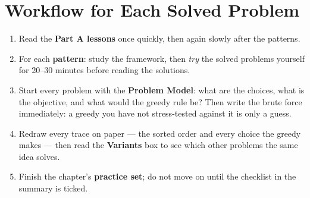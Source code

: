 \section*{Workflow for Each Solved Problem}

\begin{insightbox}
\begin{center}
\end{center}
\begin{enumerate}[leftmargin=*]
    \item Read the \textbf{Part A lessons} once quickly, then again slowly after the patterns.
    \item For each \textbf{pattern}: study the framework, then \emph{try} the solved problems yourself for 20--30 minutes before reading the solutions.
    \item Start every problem with the \textbf{Problem Model}: what are the choices, what is the objective, and what would the greedy rule be? Then write the brute force immediately: a greedy you have not stress-tested against it is only a guess.
    \item Redraw every trace on paper --- the sorted order and every choice the greedy makes --- then read the \textbf{Variants} box to see which other problems the same idea solves.
    \item Finish the chapter's \textbf{practice set}; do not move on until the checklist in the summary is ticked.
\end{enumerate}
\end{insightbox}

